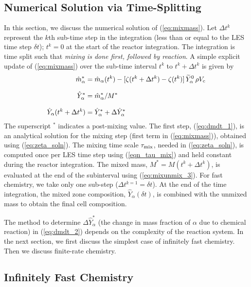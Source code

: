 \subsection{Numerical Solution via Time-Splitting}
\label{sec:reac_time_integration}

In this section, we discuss the numerical solution of (\ref{eq:mixmass}). Let $\Delta t^k$ represent the $k$th sub-time step in the integration (less than or equal to the LES time step $\delta t$); $t^k=0$ at the start of the reactor integration.  The integration is time split such that \emph{mixing is done first, followed by reaction}. A simple explicit update of (\ref{eq:mixmass}) over the sub-time interval $t^k$ to $t^k + \Delta t^k$ is given by
\begin{align}
\label{eq:dmdt_1} \hat{m}_\alpha^* &= \hat{m}_{\alpha}(t^k) - [ \zeta(t^k+\Delta t^k) - \zeta(t^k) ] \, \widetilde{Y}_{\alpha}^0 \, \rho V_{\rm c} \\[0.1in]
\label{eq:ystar}  \hat{Y}_\alpha^* &= \hat{m}_\alpha^*/M^* \\[0.1in]
\label{eq:dmdt_2} \hat{Y}_\alpha(t^k + \Delta t^k) &= \hat{Y}_\alpha^* + \Delta \hat{Y}_\alpha^*
\end{align}
The superscript $^*$ indicates a post-mixing value.  The first step, (\ref{eq:dmdt_1}), is an analytical solution for the mixing step (first term in (\ref{eq:mixmass})), obtained using (\ref{eq:zeta_soln}).  The mixing time scale $\tau_{\rm mix}$, needed in (\ref{eq:zeta_soln}), is computed once per LES time step using (\ref{eqn_tau_mix}) and held constant during the reactor integration. The mixed mass, $M^* = M(t^k + \Delta t^k)$, is evaluated at the end of the subinterval using (\ref{eq:mixunmix_3}). For fast chemistry, we take only one sub-step ($\Delta t^{k=1} = \delta t$). At the end of the time integration, the mixed zone composition, $\hat{Y}_\alpha(\delta t)$, is combined with the unmixed mass to obtain the final cell composition.

The method to determine $\Delta \hat{Y}_\alpha^*$ (the change in mass fraction of $\alpha$ due to chemical reaction) in (\ref{eq:dmdt_2}) depends on the complexity of the reaction system. In the next section, we first discuss the simplest case of infinitely fast chemistry.  Then we discuss finite-rate chemistry.



\subsection{Infinitely Fast Chemistry}
\label{sec:fastchemistry}

